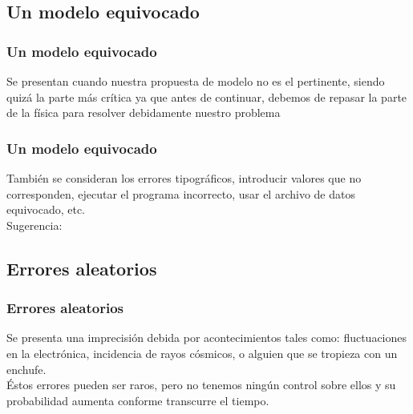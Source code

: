 \subsection{Un modelo equivocado}
\begin{frame}
\frametitle{Un modelo equivocado}
Se presentan cuando nuestra propuesta de modelo no es el pertinente, siendo quizá la parte más crítica ya que antes de continuar, debemos de repasar la parte de la física para resolver debidamente nuestro problema
\end{frame}
\begin{frame}
\frametitle{Un modelo equivocado}
También se consideran los errores tipográficos, introducir valores que no corresponden, ejecutar el programa incorrecto, usar el archivo de datos equivocado, etc.
\\
\bigskip
Sugerencia: \pause {}
\end{frame}
\subsection{Errores aleatorios}
\begin{frame}
\frametitle{Errores aleatorios}
Se presenta una imprecisión debida por acontecimientos tales como: fluctuaciones en la electrónica, incidencia de rayos cósmicos, o alguien que se tropieza con un enchufe.
\\
\bigskip
Éstos errores pueden ser raros, pero no tenemos ningún control sobre ellos y su probabilidad aumenta conforme transcurre el tiempo.
\end{frame}

